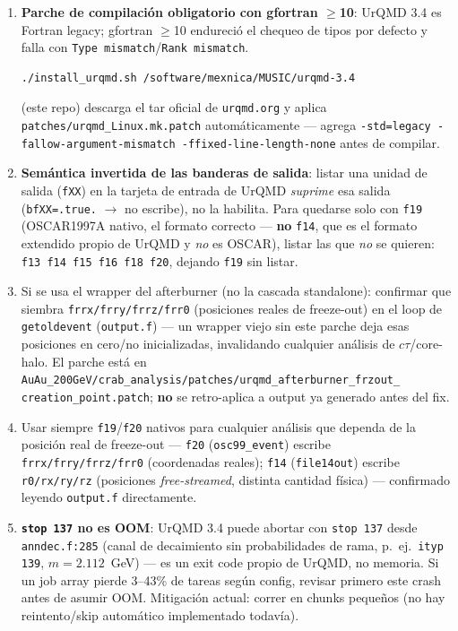 \documentclass[11pt]{article}
\begin{document}
\begin{enumerate}[leftmargin=*]
  \item \textbf{Parche de compilación obligatorio con gfortran $\ge$10}:
  UrQMD 3.4 es Fortran legacy; gfortran $\ge$10 endureció el chequeo de
  tipos por defecto y falla con \texttt{Type mismatch}/\texttt{Rank
  mismatch}.
\begin{Verbatim}[fontsize=\small]
./install_urqmd.sh /software/mexnica/MUSIC/urqmd-3.4
\end{Verbatim}
  (este repo) descarga el tar oficial de \texttt{urqmd.org} y aplica
  \texttt{patches/urqmd\_Linux.mk.patch} automáticamente --- agrega
  \texttt{-std=legacy -fallow-argument-mismatch -ffixed-line-length-none}
  antes de compilar.
  \item \textbf{Semántica invertida de las banderas de salida}: listar una
  unidad de salida (\texttt{fXX}) en la tarjeta de entrada de UrQMD
  \emph{suprime} esa salida (\texttt{bfXX=.true.} $\to$ no escribe), no la
  habilita. Para quedarse solo con \texttt{f19} (OSCAR1997A nativo, el
  formato correcto --- \textbf{no} \texttt{f14}, que es el formato extendido
  propio de UrQMD y \emph{no} es OSCAR), listar las que \emph{no} se
  quieren: \texttt{f13 f14 f15 f16 f18 f20}, dejando \texttt{f19} sin listar.
  \item Si se usa el wrapper del afterburner (no la cascada standalone):
  confirmar que siembra \texttt{frrx/frry/frrz/frr0} (posiciones reales de
  freeze-out) en el loop de \texttt{getoldevent} (\texttt{output.f}) ---
  un wrapper viejo sin este parche deja esas posiciones en cero/no
  inicializadas, invalidando cualquier análisis de $c\tau$/core-halo. El
  parche está en
  \texttt{AuAu\_200GeV/crab\_analysis/patches/urqmd\_afterburner\_frzout\_
  creation\_point.patch}; \textbf{no} se retro-aplica a output ya generado
  antes del fix.
  \item Usar siempre \texttt{f19}/\texttt{f20} nativos para cualquier
  análisis que dependa de la posición real de freeze-out --- \texttt{f20}
  (\texttt{osc99\_event}) escribe \texttt{frrx/frry/frrz/frr0} (coordenadas
  reales); \texttt{f14} (\texttt{file14out}) escribe \texttt{r0/rx/ry/rz}
  (posiciones \emph{free-streamed}, distinta cantidad física) --- confirmado
  leyendo \texttt{output.f} directamente.
  \item \textbf{\texttt{stop 137} no es OOM}: UrQMD 3.4 puede abortar con
  \texttt{stop 137} desde \texttt{anndec.f:285} (canal de decaimiento sin
  probabilidades de rama, p.\ ej.\ \texttt{ityp 139}, $m=2.112$~GeV) --- es
  un exit code propio de UrQMD, no memoria. Si un job array pierde
  3--43\% de tareas según config, revisar primero este crash antes de
  asumir OOM. Mitigación actual: correr en chunks pequeños (no hay
  reintento/skip automático implementado todavía).
\end{enumerate}
\end{document}
